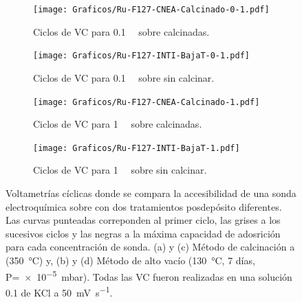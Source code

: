 	  		\begin{figure}[bt!]
		 	
		 	\begin{subfigure}[t]{0.5\textwidth}
		          	\texttt{[image: Graficos/Ru-F127-CNEA-Calcinado-0-1.pdf]}
		          	\vspace*{-6mm}
		         	\caption{Ciclos de VC para \ru\space \SI{0.1}{\milli\Molar} sobre \pdmF\space calcinadas.}
		          	\vspace*{3mm}
		          	\label{fig:cal_01mM}
		          	\end{subfigure}
		    \begin{subfigure}[t]{0.5\textwidth}
		          	\texttt{[image: Graficos/Ru-F127-INTI-BajaT-0-1.pdf]}
		         	\vspace*{-6mm}
		         	\caption{Ciclos de VC para \ru\space \SI{0.1}{\milli\Molar} sobre \pdmF\space sin calcinar.}
		      		\vspace*{3mm}
		      		\label{fig:vac_01mM}
		      		\end{subfigure}
		    \begin{subfigure}[t]{0.5\textwidth}
		          	\texttt{[image: Graficos/Ru-F127-CNEA-Calcinado-1.pdf]}
		         	\vspace*{-6mm}
		         	\caption{Ciclos de VC para \ru\space \SI{1}{\milli\Molar} sobre \pdmF\space calcinadas.}
		            \vspace*{3mm}
		            \label{fig:cal_1mM}
		            \end{subfigure}
		    \begin{subfigure}[t]{0.5\textwidth}
		          	\texttt{[image: Graficos/Ru-F127-INTI-BajaT-1.pdf]}
		         	\vspace*{-6mm}
		         	\caption{Ciclos de VC para \ru\space \SI{1}{\milli\Molar} sobre \pdmF\space sin calcinar.}
		    		\vspace*{3mm}
		    		\label{fig:vac_1mM}
		    		\end{subfigure}
		      	 	\caption[Voltagrama comparativo SF calcinados/alto vacío I]{Voltametrías cíclicas donde se compara la accesibilidad de una sonda electroquímica sobre \pdmF\space con dos tratamientos posdepósito diferentes. Las curvas punteadas correponden al primer ciclo, las grises a los sucesivos ciclos y las negras a la máxima capacidad de adosrición para cada concentración de sonda. (a) y (c) Método de calcinación a (\SI{350}{\celsius}) y, (b) y (d) Método de alto vacío (\SI{130}{\celsius}, 7 días, P=\SI{e-5}{\milli\bar}). Todas las VC fueron realizadas en una solución \SI{0.1}{\Molar} de KCl a \SI{50}{\milli\volt\per\second}.}
		      		\label{fig:comp-calc-vacio}
		      		\vspace*{3mm}
	      \end{figure}

